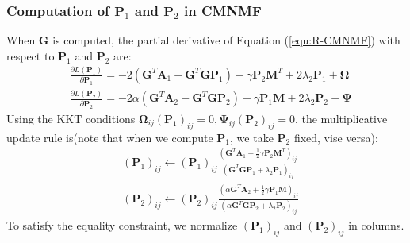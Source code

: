 \documentclass{bmcart}
\begin{document}
\subsubsection*{\textbf{Computation of $\bm{P}_1$ and $\bm{P}_2$ in CMNMF}}
When $\bm{G}$ is computed,
the partial derivative of Equation (\ref{equ:R-CMNMF}) with respect to $\bm{P}_1$ and $\bm{P}_2$ are:
\begin{equation}\label{equ:P1_gradient}\nonumber
\begin{split}
&\frac{\partial{L(\bm{P}_1)}}{\partial{\bm{P}_1}}=
-2(\bm{G}^T\bm{A}_1-{\bm{G}^T\bm{GP}_1})-\gamma \bm{P}_2\bm{M}^T +2\lambda_2\bm{P}_1+\bm{\Omega}\\
&\frac{\partial{L(\bm{P}_2)}}{\partial{\bm{P}_2}}=
-2\alpha(\bm{G}^T\bm{A}_2-{\bm{G}^T\bm{GP}_2})-\gamma \bm{P}_1\bm{M} +2\lambda_2\bm{P}_2+\bm{\Psi}
\end{split}
\end{equation}
Using the KKT conditions
 $\bm{\Omega}_{ij}(\bm{P}_1)_{ij}=0 , \bm{\Psi}_{ij}(\bm{P}_2)_{ij}=0$, the multiplicative update rule is(note that when we compute $\bm{P}_1$, we take $\bm{P}_2$ fixed, vise versa):
\begin{equation}\label{updating_P}\nonumber
\begin{split}
&(\bm{P}_1)_{ij}\leftarrow (\bm{P}_1)_{ij}
\frac{(\bm{G}^T\bm{A}_1+\frac{1}{2}\gamma \bm{P}_2\bm{M}^T)_{ij}}
{(\bm{G}^T\bm{GP}_1+\lambda_2\bm{P}_1)_{ij}}\\
&(\bm{P}_2)_{ij}\leftarrow (\bm{P}_2)_{ij}
\frac{(\alpha \bm{G}^T\bm{A}_2+\frac{1}{2}\gamma \bm{P}_1\bm{M})_{ij}}
{(\alpha \bm{G}^T\bm{GP}_2 + \lambda_2\bm{P}_2)_{ij}}
\end{split}
\end{equation}
To satisfy the equality constraint, we normalize $(\bm{P}_1)_{ij}$ and $(\bm{P}_2)_{ij}$ in columns.
\end{document}
